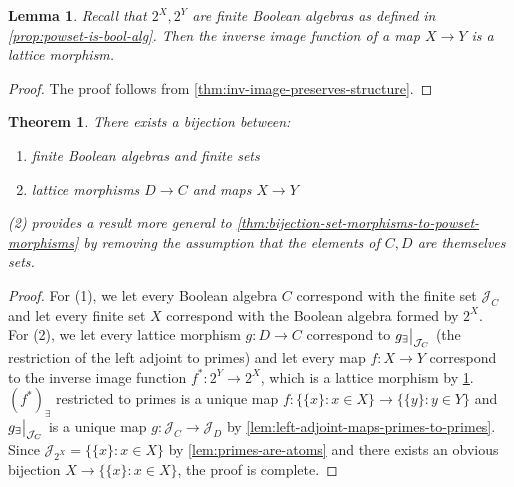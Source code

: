\documentclass{article}
\newtheorem{theorem}[proposition]{Theorem}
\newtheorem{lemma}[proposition]{Lemma}
\newcommand\restr[2]{{%
  \left.\kern-\nulldelimiterspace %
  #1 %
  \vphantom{\big|} %
  \right|_{#2} %
}}
\begin{document}
\begin{lemma} \label{lem:inv-image-is-lattice-morphism}
Recall that $2^X, 2^Y$ are finite Boolean algebras as defined in \cref{prop:powset-is-bool-alg}. Then the inverse image function of a map $X \to Y$ is a lattice morphism.
\end{lemma}

\begin{proof}
The proof follows from \cref{thm:inv-image-preserves-structure}.
\end{proof}

\begin{theorem}
There exists a bijection between:
\begin{enumerate}
    \item{finite Boolean algebras and finite sets}
    \item{lattice morphisms $D \to C$ and maps $X \to Y$}
\end{enumerate}
(2) provides a result more general to \cref{thm:bijection-set-morphisms-to-powset-morphisms} by removing the assumption that the elements of $C, D$ are themselves sets.
\end{theorem}

\begin{proof}
For (1), we let every Boolean algebra $C$ correspond with the finite set $\mathcal{J}_C$ and let every finite set $X$ correspond with the Boolean algebra formed by $2^X$. \\

For (2), we let every lattice morphism $g : D \to C$ correspond to $\restr{g_\exists}{\mathcal{J}_C}$ (the restriction of the left adjoint to primes) and let every map $f: X \to Y$ correspond to the inverse image function $f^* : 2^Y \to 2^X$, which is a lattice morphism by \cref{lem:inv-image-is-lattice-morphism}. $(f^*)_\exists$ restricted to primes is a unique map $f : \{\{x\} : x \in X\} \to \{\{y\} : y \in Y\}$ and $\restr{g_\exists}{\mathcal{J}_C}$ is a unique map $g : \mathcal{J}_C \to \mathcal{J}_D$ by \cref{lem:left-adjoint-maps-primes-to-primes}. \\

Since $\mathcal{J}_{2^X} = \{\{x\} : x \in X\}$ by \cref{lem:primes-are-atoms} and there exists an obvious bijection $X \to \{\{x\} : x \in X\}$, the proof is complete.
\end{proof}
\end{document}
